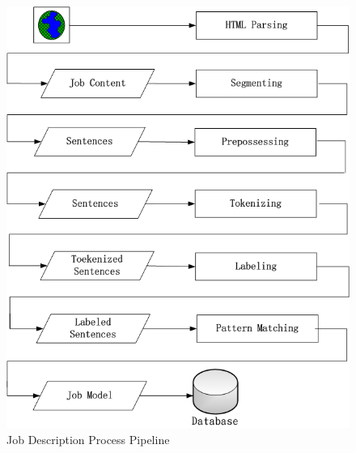 \begin{figure}[htbp]
  \centering
  \includegraphics[scale=0.4]{images/pipeline2.png}
  \caption{Job Description Process Pipeline}
  \label{fig:Pipeline}
\end{figure}
